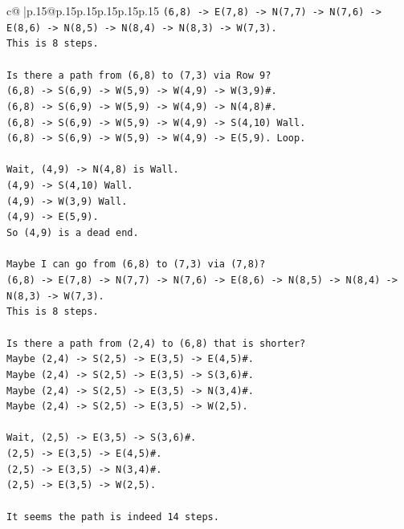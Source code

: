 \documentclass{article}
\begin{document}
{\begin{supertabular}{c@{$\;$}|p{.15\linewidth}@{}p{.15\linewidth}p{.15\linewidth}p{.15\linewidth}p{.15\linewidth}p{.15\linewidth}}
{{{\texttt{(6,8) {-}> E(7,8) {-}> N(7,7) {-}> N(7,6) {-}> E(8,6) {-}> N(8,5) {-}> N(8,4) {-}> N(8,3) {-}> W(7,3).} \\
\texttt{This is 8 steps.} \\
\\ 
\texttt{Is there a path from (6,8) to (7,3) via Row 9?} \\
\texttt{(6,8) {-}> S(6,9) {-}> W(5,9) {-}> W(4,9) {-}> W(3,9)\#.} \\
\texttt{(6,8) {-}> S(6,9) {-}> W(5,9) {-}> W(4,9) {-}> N(4,8)\#.} \\
\texttt{(6,8) {-}> S(6,9) {-}> W(5,9) {-}> W(4,9) {-}> S(4,10) Wall.} \\
\texttt{(6,8) {-}> S(6,9) {-}> W(5,9) {-}> W(4,9) {-}> E(5,9). Loop.} \\
\\ 
\texttt{Wait, (4,9) {-}> N(4,8) is Wall.} \\
\texttt{(4,9) {-}> S(4,10) Wall.} \\
\texttt{(4,9) {-}> W(3,9) Wall.} \\
\texttt{(4,9) {-}> E(5,9).} \\
\texttt{So (4,9) is a dead end.} \\
\\ 
\texttt{Maybe I can go from (6,8) to (7,3) via (7,8)?} \\
\texttt{(6,8) {-}> E(7,8) {-}> N(7,7) {-}> N(7,6) {-}> E(8,6) {-}> N(8,5) {-}> N(8,4) {-}> N(8,3) {-}> W(7,3).} \\
\texttt{This is 8 steps.} \\
\\ 
\texttt{Is there a path from (2,4) to (6,8) that is shorter?} \\
\texttt{Maybe (2,4) {-}> S(2,5) {-}> E(3,5) {-}> E(4,5)\#.} \\
\texttt{Maybe (2,4) {-}> S(2,5) {-}> E(3,5) {-}> S(3,6)\#.} \\
\texttt{Maybe (2,4) {-}> S(2,5) {-}> E(3,5) {-}> N(3,4)\#.} \\
\texttt{Maybe (2,4) {-}> S(2,5) {-}> E(3,5) {-}> W(2,5).} \\
\\ 
\texttt{Wait, (2,5) {-}> E(3,5) {-}> S(3,6)\#.} \\
\texttt{(2,5) {-}> E(3,5) {-}> E(4,5)\#.} \\
\texttt{(2,5) {-}> E(3,5) {-}> N(3,4)\#.} \\
\texttt{(2,5) {-}> E(3,5) {-}> W(2,5).} \\
\\ 
\texttt{It seems the path is indeed 14 steps.} \\
}}}
\end{supertabular}}
\end{document}
